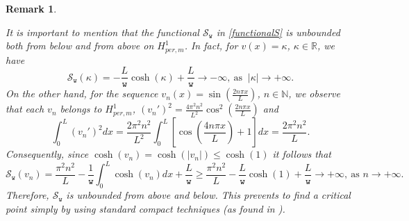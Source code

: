 \documentclass[12pt,reqno,a4paper]{amsart} %
\numberwithin{equation}{section}
\numberwithin{figure}{section}
\newtheorem{remark}[theorem]{Remark}
\begin{document}
 
 \begin{remark}\label{boundedba}
 	
 	It is important to mention that the functional $\mathcal{S}_\mathtt{w}$ in \eqref{functionalS} is unbounded both from below and from above on $H^1_{per,m}$. In fact, for $v(x)=\kappa$, $\kappa\in \mathbb{R}$, we have 
 	\begin{equation*}
 		\mathcal{S}_\mathtt{w}(\kappa) =-\frac{L}{\mathtt{w}} \cosh(\kappa) +\frac{L}{\mathtt{w}}\to -\infty,
 	\  \text{as } \ |\kappa|\to+\infty.
 	\end{equation*}
 	On the other hand, for the sequence $v_n(x)=\sin\left(\frac{2n \pi  x}{L}\right)$, $n\in \mathbb{N}$, we observe that each $v_n$	belongs to $H^1_{per,m}$, $(v_n')^2=\frac{4\pi^2n^2}{L^2} \cos^2\left(\frac{2n\pi x}{L}\right)$ and
 	\begin{equation*}
 		\int_0^L (v_n')^2 dx = \frac{2\pi^2n^2}{L^2}\int_{0}^{L}\left[\cos\left(\frac{4n\pi x}{L}\right)+1\right] dx=\frac{2\pi^2n^2}{L}.
 	\end{equation*}Consequently, since $\cosh(v_n)=\cosh(|v_n|)\leq \cosh(1)$ it follows that
 	\begin{equation*}
 		\mathcal{S}_\mathtt{w}(v_n)= \frac{ \pi^2n^2}{L}-\frac{1}{\mathtt{w}}\int_{0}^{L}\cosh(v_n)dx+\frac{L}{\mathtt{w}}\ge  \frac{ \pi^2n^2}{L}-\frac{L}{\mathtt{w}}\cosh(1) +\frac{L}{\mathtt{w}}\to +\infty,
 	\ \text{as } n\to+\infty.
 	\end{equation*} 		
 	Therefore, $\mathcal{S}_\mathtt{w}$ is unbounded from above and below. This prevents to
 	find a critical point simply by using standard compact techniques (as found in \cite{strauss}). 
 \end{remark}
 
\end{document}
